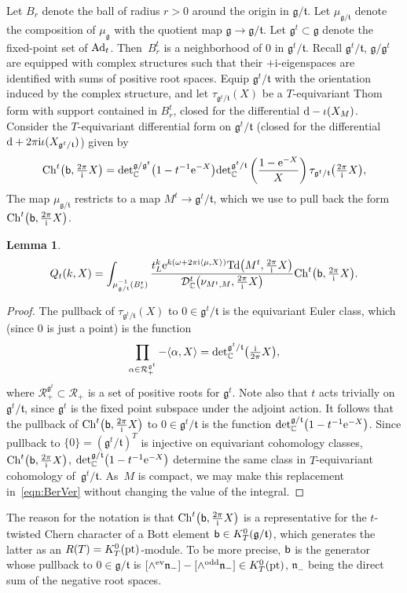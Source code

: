 \documentclass[pdftex]{sigma}
\numberwithin{equation}{section}
\newtheorem{Lemma}[Theorem]{Lemma}
\newcommand{\pair}[2]{\langle #1, #2 \rangle}
\newcommand{\tn}[1]{\textnormal{#1}}
\renewcommand{\i}{{\mathrm{i}}}
\def\Ad{\ensuremath{\textnormal{Ad}}}
\def\g{\ensuremath{\mathfrak{g}}}
\def\t{\ensuremath{\mathfrak{t}}}
\def\n{\ensuremath{\mathfrak{n}}}
\def\R{\ensuremath{\mathcal{R}}}
\def\bC{\ensuremath{\mathbb{C}}}
\def\pt{\ensuremath{\textnormal{pt}}}
\def\Ch{\ensuremath{\textnormal{Ch}}}
\def\Td{\ensuremath{\textnormal{Td}}}
\def\calDC{\ensuremath{\mathcal{D}_{\bC}}}
\def\de{\ensuremath{\tn{det}_\bC}}
\begin{document}
Let $B_r$ denote the ball of radius $r>0$ around the origin in $\g/\t$. Let $\mu_{\g/\t}$ denote the composition of $\mu_\g$ with the quotient map $\g \rightarrow \g/\t$. Let $\g^t \subset \g$ denote the fixed-point set of $\Ad_t$. Then~$B_r^t$ is a neighborhood of $0$ in $\g^t/\t$. Recall $\g^t/\t$, $\g/\g^t$ are equipped with complex structures such that their $+\i$-eigenspaces are identified with sums of positive root spaces. Equip $\g^t/\t$ with the orientation induced by the complex structure, and let $\tau_{\g^t/\t}(X)$ be a $T$-equivariant Thom form with support contained in $B_r^t$, closed for the differential ${\rm d}-\iota(X_M)$. Consider the $T$-equivariant differential form on $\g^t/\t$ (closed for the differential ${\rm d}+2\pi \i \iota(X_{\g^t/\t})$) given by
\[ \Ch^t\big({\sf b},\tfrac{2\pi}{\i}X\big)=\de^{\g/\g^t}\big(1-t^{-1}{\rm e}^{-X}\big)\de^{\g^t/\t}\left(\frac{1-{\rm e}^{-X}}{X}\right)\tau_{\g^t/\t}\big(\tfrac{2\pi}{\i}X\big),\]
The map $\mu_{\g/\t}$ restricts to a map $M^t \rightarrow \g^t/\t$, which we use to pull back the form $\Ch^t\big({\sf b},\tfrac{2\pi}{\i}X\big)$.
\begin{Lemma}
\begin{gather}\label{eqn:Qg}
Q_t(k,X)=\int_{\mu_{\g/\t}^{-1}(B_r^t)} \frac{t_L^k {\rm e}^{k(\omega+2\pi \i\pair{\mu}{X})}\Td\big(M^t,\tfrac{2\pi}{\i}X\big)}{\calDC^t\big(\nu_{M^t,M},\tfrac{2\pi}{\i}X\big)}\Ch^t\big({\sf b},\tfrac{2\pi}{\i}X\big).
\end{gather}
\end{Lemma}
\begin{proof}The pullback of $\tau_{\g^t/\t}(X)$ to $0 \in \g^t/\t$ is the equivariant Euler class, which (since $0$ is just a point) is the function
\[ \prod_{\alpha \in \R^{\g^t}_+} -\pair{\alpha}{X}=\de^{\g^t/\t}\big(\tfrac{\i}{2\pi}X\big),\]
where $\R^{\g^t}_+\subset \R_+$ is a set of positive roots for $\g^t$. Note also that $t$ acts trivially on $\g^t/\t$, since $\g^t$ is the fixed point subspace under the adjoint action. It follows that the pullback of $\Ch^t\big({\sf b},\tfrac{2\pi}{\i}X\big)$ to $0 \in \g^t/\t$ is the function $\de^{\g/\t}\big(1-t^{-1}{\rm e}^{-X}\big)$. Since pullback to $\{0\}=(\g^t/\t)^T$ is injective on equivariant cohomology classes, $\Ch^t\big({\sf b},\tfrac{2\pi}{\i}X\big)$, $\de^{\g/\t}\big(1-t^{-1}{\rm e}^{-X}\big)$ determine the same class in $T$-equivariant cohomology of~$\g^t/\t$. As~$M$ is compact, we may make this replacement in~\eqref{eqn:BerVer} without changing the value of the integral.
\end{proof}
\begin{Remark}
The reason for the notation is that $\Ch^t\big({\sf b},\tfrac{2\pi}{\i}X\big)$ is a representative for the $t$-twisted Chern character of a Bott element ${\sf b} \in K_T^0(\g/\t)$, which generates the latter as an $R(T)=K_T^0(\pt)$-module. To be more precise, ${\sf b}$ is the generator whose pullback to $0 \in \g/\t$ is $[\wedge^{\tn{ev}} \n_-]-[\wedge^{\tn{odd}}\n_-] \in K^0_T(\pt)$, $\n_-$ being the direct sum of the negative root spaces.
\end{Remark}
\end{document}
